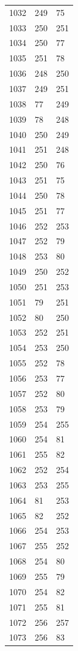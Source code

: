 \documentclass[a4paper,11pt]{article}
\begin{document}
\begin{center}
\begin{longtable}{|R{1.5cm}|R{1.5cm}|R{1.5cm}|}
 1032 &  249 &   75 \\
 1033 &  250 &  251 \\
 1034 &  250 &   77 \\
 1035 &  251 &   78 \\
 1036 &  248 &  250 \\
 1037 &  249 &  251 \\
 1038 &   77 &  249 \\
 1039 &   78 &  248 \\
 1040 &  250 &  249 \\
 1041 &  251 &  248 \\
 1042 &  250 &   76 \\
 1043 &  251 &   75 \\
 1044 &  250 &   78 \\
 1045 &  251 &   77 \\
 1046 &  252 &  253 \\
 1047 &  252 &   79 \\
 1048 &  253 &   80 \\
 1049 &  250 &  252 \\
 1050 &  251 &  253 \\
 1051 &   79 &  251 \\
 1052 &   80 &  250 \\
 1053 &  252 &  251 \\
 1054 &  253 &  250 \\
 1055 &  252 &   78 \\
 1056 &  253 &   77 \\
 1057 &  252 &   80 \\
 1058 &  253 &   79 \\
 1059 &  254 &  255 \\
 1060 &  254 &   81 \\
 1061 &  255 &   82 \\
 1062 &  252 &  254 \\
 1063 &  253 &  255 \\
 1064 &   81 &  253 \\
 1065 &   82 &  252 \\
 1066 &  254 &  253 \\
 1067 &  255 &  252 \\
 1068 &  254 &   80 \\
 1069 &  255 &   79 \\
 1070 &  254 &   82 \\
 1071 &  255 &   81 \\
 1072 &  256 &  257 \\
 1073 &  256 &   83 \\

\end{longtable}
\end{center}
\end{document}

